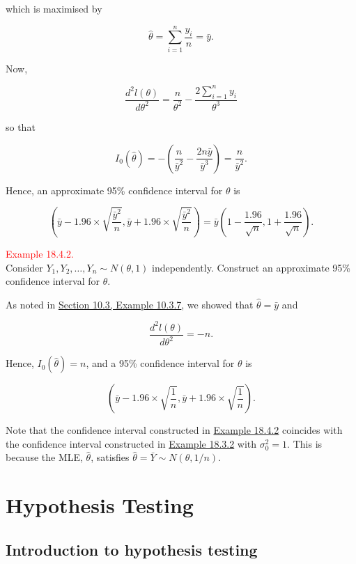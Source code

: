 \documentclass[
]{book}
\begin{document}
which is maximised by

\[ \hat{\theta}=\sum_{i=1}^n \frac{y_i}{n}=\bar{y}. \]

Now,

\[ \frac{d^2l(\theta)}{d\theta^2} = \frac{n}{\theta^2} - \frac{2\sum_{i=1}^n y_i}{\theta^3} \]

so that

\[ I_0(\hat{\theta}) = -\left(\frac{n}{\bar{y}^2}-\frac{2n\bar{y}}{\bar{y}^3}\right)
=\frac{n}{\bar{y}^2}.\]

Hence, an approximate 95\% confidence interval for \(\theta\) is

\[ \left( \bar{y} - 1.96 \times \sqrt{\frac{\bar{y}^2}{n}}, \bar{y}+ 1.96 \times \sqrt{\frac{\bar{y}^2}{n}} \right)  = \bar{y} \left( 1- \frac{1.96}{\sqrt{n}}, 1+ \frac{1.96}{\sqrt{n}} \right).\]

\hfill\break

\leavevmode{}%
\textcolor{red}{Example 18.4.2.}\\
Consider \(Y_1,Y_2,\ldots,Y_n \sim N(\theta,1)\) independently. Construct an approximate 95\% confidence interval for \(\theta\).

As noted in \protect\hyperlink{MLE:MLE}{Section 10.3, Example 10.3.7}, we showed that \(\hat{\theta} = \bar{y}\) and

\[ \frac{d^2l(\theta)}{d\theta^2}=-n.\]

Hence, \(I_0(\hat{\theta})=n\), and a 95\% confidence interval for \(\theta\) is

\[ \left( \bar{y} - 1.96 \times \sqrt{\frac{1}{n}}, \bar{y} + 1.96 \times \sqrt{\frac{1}{n}} \right). \]

\hfill\break

Note that the confidence interval constructed in \protect\hyperlink{Interval_Estimation:ex:CI_mle_normal}{Example 18.4.2} coincides with the confidence interval constructed in \protect\hyperlink{Interval_Estimation:ex:CI_normal_known}{Example 18.3.2} with \(\sigma_0^2 =1\). This is because the MLE, \(\hat{\theta}\), satisfies \(\hat{\theta} = \bar{Y} \sim N(\theta, 1/n)\).

\hypertarget{Sec_Hypo_Test}{%
\chapter{Hypothesis Testing}\label{Sec_Hypo_Test}}

\hypertarget{Sec_Hypo_Test:intro}{%
\section{Introduction to hypothesis testing}\label{Sec_Hypo_Test:intro}}
\end{document}
